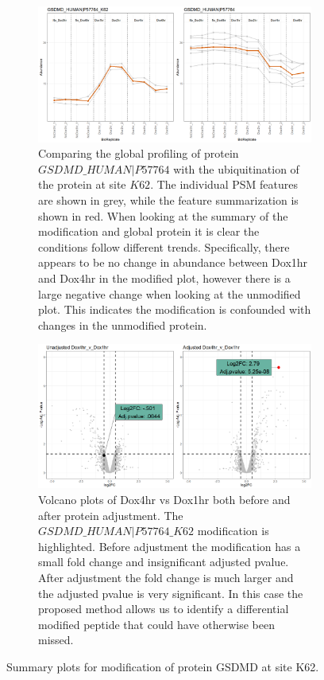 \documentclass{mcp}
\begin{document}
\begin{figure}[h!]
\centering
 \begin{subfigure}{\textwidth}
 \centering
	\includegraphics[width=.9\textwidth]{sim_new/IpaH_prof_plot}
	\caption{Comparing the global profiling of protein $GSDMD\_HUMAN|P57764$ with the ubiquitination of the protein at site $K62$. The individual PSM features are shown in grey, while the feature summarization is shown in red. When looking at the summary of the modification and global protein it is clear the conditions follow different trends. Specifically, there appears to be no change in abundance between Dox1hr and Dox4hr in the modified plot, however there is a large negative change when looking at the unmodified plot. This indicates the modification is confounded with changes in the unmodified protein.}
 \end{subfigure}
 \begin{subfigure}{\textwidth}
 \centering
	\includegraphics[width=.9\textwidth]{sim_new/IpaH_volcano_plot}
	\caption{Volcano plots of Dox4hr vs Dox1hr both before and after protein adjustment. The $GSDMD\_HUMAN|P57764\_K62$ modification is highlighted. Before adjustment the modification has a small fold change and insignificant adjusted pvalue. After adjustment the fold change is much larger and the adjusted pvalue is very significant. In this case the proposed method allows us to identify a differential modified peptide that could have otherwise been missed.}
 \end{subfigure}
\caption{Summary plots for modification of protein GSDMD at site K62.}
\label{fig:ipah_figures}
\end{figure}
\end{document}
